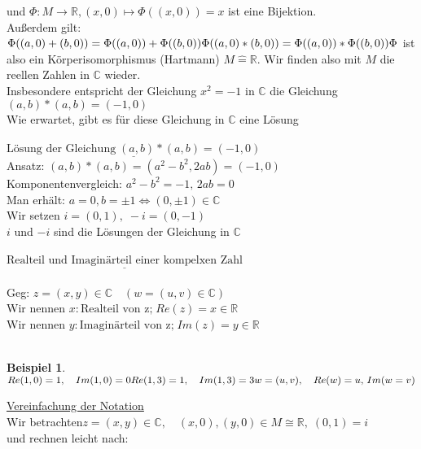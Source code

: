 \documentclass{article}
\newtheorem{example}{Beispiel}[theorem]
\begin{document}
und $\Phi :M\rightarrow\mathbb{R},(x,0)\mapsto \Phi((x,0))=x$ ist eine Bijektion.\\
Außerdem gilt:\\
$\Phi ((a,0)+(b,0))=\Phi ((a,0))+\Phi ((b,0))\\
\Phi((a,0)\ast (b,0)) = \Phi((a,0))\ast \Phi((b,0))\\
\Phi$ ist also ein Körperisomorphismus (Hartmann) $M\widehat{=}\mathbb{R}$.
Wir finden also mit $M$ die reellen Zahlen in $\mathbb{C}$ wieder.\\
Insbesondere entspricht der Gleichung $x^{2}=-1$ in $\mathbb{C}$ die Gleichung\\
$(a,b)\ast (a,b)=(-1,0)$\\
Wie erwartet, gibt es für diese Gleichung in $\mathbb{C}$ eine Lösung\\
\\
$\underline{\text{Lösung der Gleichung}\;(a,b)\ast (a,b)=(-1,0)}$\\
Ansatz: $(a,b)\ast (a,b) = (a^{2}-b^{2},2ab)=(-1,0)$\\
Komponentenvergleich: $a^{2}-b^{2}=-1,\,2ab=0$\\
Man erhält: $a=0, b=\pm 1\Leftrightarrow (0,\pm 1)\in\mathbb{C}$\\
Wir setzen $i=(0,1),\; -i=(0,-1)$\\
$i$ und $-i$ sind die Lösungen der Gleichung in $\mathbb{C}$\\
\\
$\underline{\text{Realteil und Imaginärteil einer kompelxen Zahl}}$\\
\\
Geg: $z=(x,y)\in \mathbb{C}\quad (w=(u,v)\in \mathbb{C})$\\
Wir nennen $x:\text{Realteil von z;}\; Re(z)=x\in\mathbb{R}$\\
Wir nennen $y:\text{Imaginärteil von z;}\; Im(z)=y\in\mathbb{R}$\\
\\
\setcounter{example}{1}
\begin{example}\,\\
    $Re(1,0)=1,\quad Im(1,0)=0\\
    Re(1,3)=1,\quad Im(1,3)=3\\
    w=(u,v),\quad Re(w)=u,\, Im(w=v)$
\end{example}
\underline{Vereinfachung der Notation}\\
Wir betrachten\quad $z=(x,y)\in\mathbb{C},\quad (x,0),(y,0)\in M\cong\mathbb{R},\;(0,1)=i$\\
und rechnen leicht nach:\\
\end{document}
